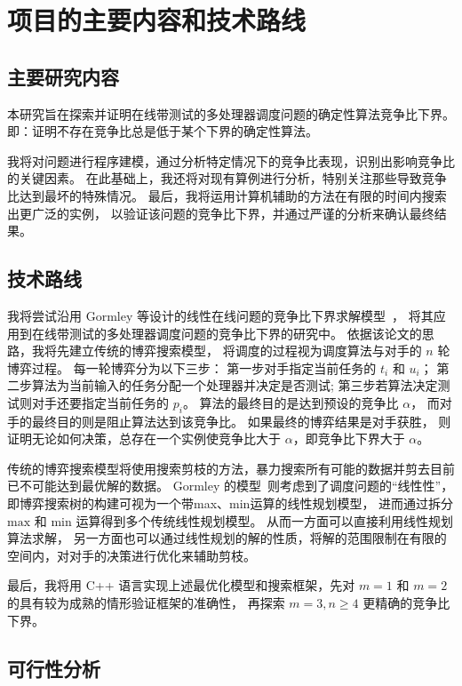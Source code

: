\section{项目的主要内容和技术路线}

\subsection{主要研究内容}

本研究旨在探索并证明在线带测试的多处理器调度问题的确定性算法竞争比下界。
即：证明不存在竞争比总是低于某个下界的确定性算法。

我将对问题进行程序建模，通过分析特定情况下的竞争比表现，识别出影响竞争比的关键因素。
在此基础上，我还将对现有算例进行分析，特别关注那些导致竞争比达到最坏的特殊情况。
最后，我将运用计算机辅助的方法在有限的时间内搜索出更广泛的实例，
以验证该问题的竞争比下界，并通过严谨的分析来确认最终结果。

\subsection{技术路线}

我将尝试沿用 Gormley 等设计的线性在线问题的竞争比下界求解模型~\cite{gormley2000generating}，
将其应用到在线带测试的多处理器调度问题的竞争比下界的研究中。
依据该论文的思路，我将先建立传统的博弈搜索模型，
将调度的过程视为调度算法与对手的 $n$ 轮博弈过程。
每一轮博弈分为以下三步：
第一步对手指定当前任务的 $t_i$ 和 $u_i$；
第二步算法为当前输入的任务分配一个处理器并决定是否测试;
第三步若算法决定测试则对手还要指定当前任务的 $p_i$。
算法的最终目的是达到预设的竞争比 $\alpha$，
而对手的最终目的则是阻止算法达到该竞争比。
如果最终的博弈结果是对手获胜，
则证明无论如何决策，总存在一个实例使竞争比大于 $\alpha$，即竞争比下界大于 $\alpha$。

传统的博弈搜索模型将使用搜索剪枝的方法，暴力搜索所有可能的数据并剪去目前已不可能达到最优解的数据。
Gormley 的模型~\cite{gormley2000generating}则考虑到了调度问题的“线性性”，即博弈搜索树的构建可视为一个带max、min运算的线性规划模型，
进而通过拆分 $\text{max}$ 和 $\text{min}$ 运算得到多个传统线性规划模型。
从而一方面可以直接利用线性规划算法求解，
另一方面也可以通过线性规划的解的性质，将解的范围限制在有限的空间内，对对手的决策进行优化来辅助剪枝。

最后，我将用 C++ 语言实现上述最优化模型和搜索框架，先对 $m=1$ 和 $m=2$ 的具有较为成熟的情形验证框架的准确性，
再探索 $m=3, n\geq 4$ 更精确的竞争比下界。

\subsection{可行性分析}

